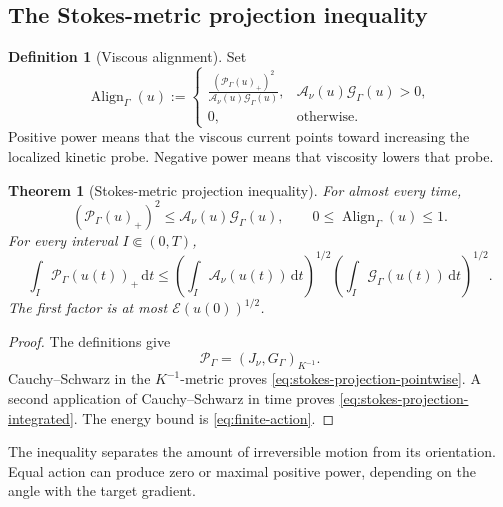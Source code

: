 \documentclass[11pt]{amsart}
\numberwithin{equation}{section}
\theoremstyle{plain}
\newtheorem{theorem}{Theorem}[section]
\theoremstyle{definition}
\newtheorem{definition}[definition]{Definition}
\theoremstyle{remark}
\newcommand{\dd}{\,\mathrm d}
\newcommand{\Energy}{\mathcal E}
\newcommand{\Action}{\mathcal A}
\newcommand{\ProbeDirichlet}{\mathcal G}
\newcommand{\Power}{\mathcal P}
\newcommand{\Align}{\operatorname{Align}}
\begin{document}
\subsection{The Stokes-metric projection inequality}

\begin{definition}[Viscous alignment]
\label{def:alignment}
Set
\begin{equation}\label{eq:alignment}
 \Align_\Gamma(u)
 :=
 \begin{cases}
 \displaystyle
 \frac{(\Power_\Gamma(u)_+)^2}
 {\Action_\nu(u)\ProbeDirichlet_\Gamma(u)},
 &\Action_\nu(u)\ProbeDirichlet_\Gamma(u)>0,\\[3mm]
 0,&\text{otherwise}.
 \end{cases}
\end{equation}
Positive power means that the viscous current points toward increasing the
localized kinetic probe.  Negative power means that viscosity lowers that
probe.
\end{definition}

\begin{theorem}[Stokes-metric projection inequality]
\label{thm:stokes-projection}
For almost every time,
\begin{equation}\label{eq:stokes-projection-pointwise}
 (\Power_\Gamma(u)_+)^2
 \le\Action_\nu(u)\ProbeDirichlet_\Gamma(u),
 \qquad 0\le\Align_\Gamma(u)\le1.
\end{equation}
For every interval \(I\Subset(0,T)\),
\begin{equation}\label{eq:stokes-projection-integrated}
 \int_I\Power_\Gamma(u(t))_+\dd t
 \le
 \left(\int_I\Action_\nu(u(t))\dd t\right)^{1/2}
 \left(\int_I\ProbeDirichlet_\Gamma(u(t))\dd t\right)^{1/2}.
\end{equation}
The first factor is at most \(\Energy(u(0))^{1/2}\).
\end{theorem}

\begin{proof}
The definitions give
\[
 \Power_\Gamma=(J_\nu,G_\Gamma)_{K^{-1}}.
\]
Cauchy--Schwarz in the \(K^{-1}\)-metric proves
\eqref{eq:stokes-projection-pointwise}.  A second application of
Cauchy--Schwarz in time proves \eqref{eq:stokes-projection-integrated}.  The
energy bound is \eqref{eq:finite-action}.
\end{proof}

The inequality separates the amount of irreversible motion from its
orientation.  Equal action can produce zero or maximal positive power,
depending on the angle with the target gradient.
\end{document}
